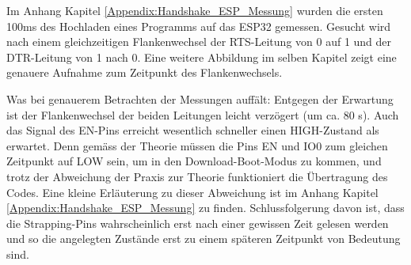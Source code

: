 \begin{enumerate}
\begin{enumerate}
Im Anhang Kapitel \ref{Appendix:Handshake_ESP_Messung} wurden die ersten 100ms des Hochladen eines Programms auf das ESP32 gemessen. Gesucht wird nach einem gleichzeitigen Flankenwechsel der RTS-Leitung von 0 auf 1 und der DTR-Leitung von 1 nach 0. Eine weitere Abbildung im selben Kapitel zeigt eine genauere Aufnahme zum Zeitpunkt des Flankenwechsels.

Was bei genauerem Betrachten der Messungen auffält: Entgegen der Erwartung ist der Flankenwechsel der beiden Leitungen leicht verzögert (um ca. 80 \textmu s). Auch das Signal des EN-Pins erreicht wesentlich schneller einen HIGH-Zustand als erwartet. Denn gemäss der Theorie müssen die Pins EN und IO0 zum gleichen Zeitpunkt auf LOW sein, um in den Download-Boot-Modus zu kommen, und trotz der Abweichung der Praxis zur Theorie funktioniert die Übertragung des Codes. Eine kleine Erläuterung zu dieser Abweichung ist im Anhang Kapitel \ref{Appendix:Handshake_ESP_Messung} zu finden. Schlussfolgerung davon ist, dass die Strapping-Pins wahrscheinlich erst nach einer gewissen Zeit gelesen werden und so die angelegten Zustände erst zu einem späteren Zeitpunkt von Bedeutung sind.

\end{enumerate}

\end{enumerate}

